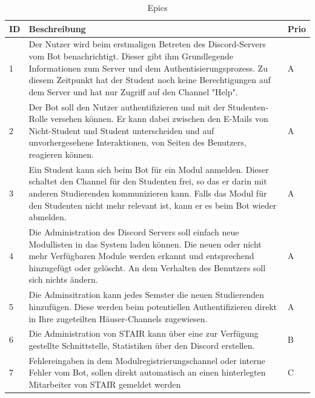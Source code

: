 \documentclass[a4paper, table]{article}
\begin{document}
\begin{table}[h]
    \centering
    \begin{tabular}{ | p{1em} | p{35em} | p{2em} |}
        \hline
        \rowcolor[gray]{.9} ID & Beschreibung & Prio \\
        \hline
        1 & Der Nutzer wird beim erstmaligen Betreten des Discord-Servers vom Bot benachrichtigt.
        Dieser gibt ihm Grundlegende Informationen zum Server und dem Authentisierungsprozess.
        Zu diesem Zeitpunkt hat der Student noch keine Berechtigungen auf dem Server und
        hat nur Zugriff auf den Channel "Help". & A \\
        \hline
        2 & Der Bot soll den Nutzer authentifizieren und mit der Studenten-Rolle versehen können.
        Er kann dabei zwischen den E-Mails von Nicht-Student und Student unterscheiden und auf unvorhergesehene
        Interaktionen, von Seiten des Benutzers, reagieren können. & A \\
        \hline
        3 & Ein Student kann sich beim Bot für ein Modul anmelden. Dieser schaltet den Channel für den Studenten frei,
        so das er darin mit anderen Studierenden kommunizieren kann. Falls das Modul für den Studenten nicht mehr relevant ist,
        kann er es beim Bot wieder abmelden. & A \\
        \hline
        4 & Die Administration des Discord Servers soll einfach neue Modullisten in das System laden können.
        Die neuen oder nicht mehr Verfügbaren Module werden erkannt und entsprechend hinzugefügt oder gelöscht.
        An dem Verhalten des Benutzers soll sich nichts ändern. & A \\
        \hline
        5 & Die Adminsitration kann jedes Semster die neuen Studierenden hinzufügen.
        Diese werden beim potentiellen Authentifizieren direkt in Ihre zugeteilten Häuser-Channels zugewiesen. & A \\
        \hline
        6 & Die Administration von STAIR kann über eine zur Verfügung gestellte Schnittstelle, Statistiken über
        den Discord erstellen. & B \\
        \hline
        7 & Fehlereingaben in dem Modulregistrierungschannel oder interne Fehler vom Bot, sollen direkt automatisch
        an einen hinterlegten Mitarbeiter von STAIR gemeldet werden & C \\
        \hline
    \end{tabular}
    \caption{Epics}
    \label{tab: Epics}
\end{table}
\end{document}
